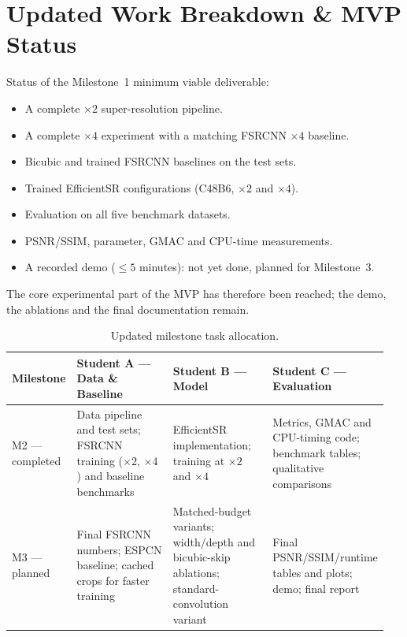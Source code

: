 \documentclass[11pt]{article}
\begin{document}
\section{Updated Work Breakdown \& MVP Status}
\label{sec:workbreakdown}
Status of the Milestone~1 minimum viable deliverable:
\begin{itemize}
    \item[$\checkmark$] A complete $\times2$ super-resolution pipeline.
    \item[$\checkmark$] A complete $\times4$ experiment with a matching FSRCNN $\times4$ baseline.
    \item[$\checkmark$] Bicubic and trained FSRCNN baselines on the test sets.
    \item[$\checkmark$] Trained EfficientSR configurations (C48B6, $\times2$ and $\times4$).
    \item[$\checkmark$] Evaluation on all five benchmark datasets.
    \item[$\checkmark$] PSNR/SSIM, parameter, GMAC and CPU-time measurements.
    \item[$\circ$] A recorded demo ($\le5$ minutes): not yet done, planned for Milestone~3.
\end{itemize}
The core experimental part of the MVP has therefore been reached; the demo, the ablations and the final documentation remain.

\begin{table}[htbp]
\centering
\caption{Updated milestone task allocation.}
\label{tab:tasks}
\small
\begin{tabular}{@{}p{0.14\linewidth}p{0.27\linewidth}p{0.27\linewidth}p{0.27\linewidth}@{}}
\toprule
\textbf{Milestone} & \textbf{Student A --- Data \& Baseline} & \textbf{Student B --- Model} & \textbf{Student C --- Evaluation} \\
\midrule
M2 --- completed &
Data pipeline and test sets; FSRCNN training ($\times2$, $\times4$) and baseline benchmarks &
EfficientSR implementation; training at $\times2$ and $\times4$ &
Metrics, GMAC and CPU-timing code; benchmark tables; qualitative comparisons \\
M3 --- planned &
Final FSRCNN numbers; ESPCN baseline; cached crops for faster training &
Matched-budget variants; width/depth and bicubic-skip ablations; standard-convolution variant &
Final PSNR/SSIM/runtime tables and plots; demo; final report \\
\bottomrule
\end{tabular}
\end{table}
\end{document}
